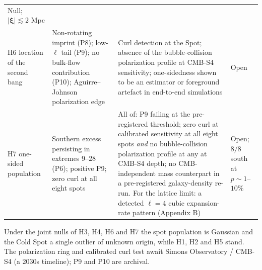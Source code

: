 \documentclass[
]{article}
\begin{document}
\begin{longtable}[]{@{}llll@{}}
\begin{minipage}[t]{0.22\columnwidth}
Null; \(|\boldsymbol{\xi}| \lesssim 2\) Mpc\strut
\end{minipage}\tabularnewline
\begin{minipage}[t]{0.22\columnwidth}\raggedright
H6 location of the second bang\strut
\end{minipage} & \begin{minipage}[t]{0.22\columnwidth}\raggedright
Non-rotating imprint (P8); low-\(\ell\) tail (P9); no bulk-flow
contribution (P10); Aguirre--Johnson polarization edge\strut
\end{minipage} & \begin{minipage}[t]{0.22\columnwidth}\raggedright
Curl detection at the Spot; absence of the bubble-collision polarization
profile at CMB-S4 sensitivity; one-sidedness shown to be an estimator or
foreground artefact in end-to-end simulations\strut
\end{minipage} & \begin{minipage}[t]{0.22\columnwidth}\raggedright
Open\strut
\end{minipage}\tabularnewline
\begin{minipage}[t]{0.22\columnwidth}\raggedright
H7 one-sided population\strut
\end{minipage} & \begin{minipage}[t]{0.22\columnwidth}\raggedright
Southern excess persisting in extremes \(9\)--\(28\) (P6); positive P9;
zero curl at all eight spots\strut
\end{minipage} & \begin{minipage}[t]{0.22\columnwidth}\raggedright
All of: P9 failing at the pre-registered threshold; zero curl at
calibrated sensitivity at all eight spots \emph{and} no bubble-collision
polarization profile at any at CMB-S4 depth; no CMB-independent mass
counterpart in a pre-registered galaxy-density re-run. For the lattice
limit: a detected \(\ell=4\) cubic expansion-rate pattern (Appendix
B)\strut
\end{minipage} & \begin{minipage}[t]{0.22\columnwidth}\raggedright
Open; \(8/8\) south at \(p \sim 1\)--\(10\%\)\strut
\end{minipage}\tabularnewline
\bottomrule
\end{longtable}

Under the joint nulls of H3, H4, H6 and H7 the spot population is
Gaussian and the Cold Spot a single outlier of unknown origin, while H1,
H2 and H5 stand. The polarization ring and calibrated curl test await
Simons Observatory / CMB-S4 (a 2030s timeline); P9 and P10 are archival.
\end{document}
